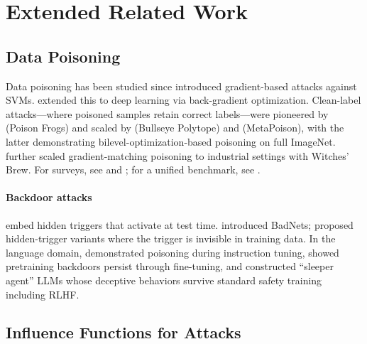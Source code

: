 \documentclass{article} %
\begin{document}
\section{Extended Related Work}
\label{apndx_related}

\subsection{Data Poisoning}

Data poisoning has been studied since \citet{biggio2012poisoning} introduced gradient-based attacks against SVMs. \citet{munoz2017towards} extended this to deep learning via back-gradient optimization. Clean-label attacks---where poisoned samples retain correct labels---were pioneered by \citet{shafahi2018poison} (Poison Frogs) and scaled by \citet{aghakhani2021bullseye} (Bullseye Polytope) and \citet{huang2020metapoison} (MetaPoison), with the latter demonstrating bilevel-optimization-based poisoning on full ImageNet. \citet{geiping2021witches} further scaled gradient-matching poisoning to industrial settings with Witches' Brew. For surveys, see \citet{goldblum2022dataset} and \citet{zhao2025data}; for a unified benchmark, see \citet{schwarzschild2021just}.

\paragraph{Backdoor attacks} embed hidden triggers that activate at test time. \citet{gu2017badnets} introduced BadNets; \citet{saha2020hidden} proposed hidden-trigger variants where the trigger is invisible in training data. In the language domain, \citet{wan2023poisoning} demonstrated poisoning during instruction tuning, \citet{zhang2024persistent} showed pretraining backdoors persist through fine-tuning, and \citet{hubinger2024sleeper} constructed ``sleeper agent'' LLMs whose deceptive behaviors survive standard safety training including RLHF.

\subsection{Influence Functions for Attacks}
\end{document}
